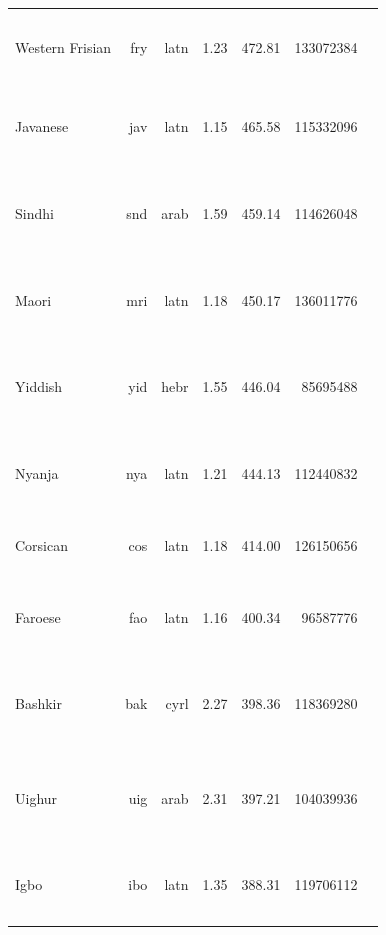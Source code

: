 \documentclass[11pt]{article}
\begin{document}
\begin{center}
\begin{longtable}[width=0.9\textwidth]{|lrrrrrl|}
Western Frisian & fry & latn & 1.23 & 472.81 & 133072384 & {\color{oscar}\rule{0.26cm}{8pt}}{\color{madlad400}\rule{2.68cm}{8pt}}{\color{glot500}\rule{0.55cm}{8pt}}{\color{other}\rule{0.5099999999999998cm}{8pt}} \\ 
Javanese & jav & latn & 1.15 & 465.58 & 115332096 & {\color{oscar}\rule{0.0cm}{8pt}}{\color{nllb}\rule{1.55cm}{8pt}}{\color{madlad400}\rule{1.86cm}{8pt}}{\color{glot500}\rule{0.27cm}{8pt}}{\color{other}\rule{0.31999999999999984cm}{8pt}} \\ 
Sindhi & snd & arab & 1.59 & 459.14 & 114626048 & {\color{oscar}\rule{0.16cm}{8pt}}{\color{nllb}\rule{1.4cm}{8pt}}{\color{madlad400}\rule{2.13cm}{8pt}}{\color{glot500}\rule{0.2cm}{8pt}}{\color{other}\rule{0.11000000000000032cm}{8pt}} \\ 
Maori & mri & latn & 1.18 & 450.17 & 136011776 & {\color{nllb}\rule{0.7cm}{8pt}}{\color{madlad400}\rule{1.56cm}{8pt}}{\color{glot500}\rule{1.69cm}{8pt}}{\color{other}\rule{0.050000000000000266cm}{8pt}} \\ 
Yiddish & yid & hebr & 1.55 & 446.04 & 85695488 & {\color{oscar}\rule{0.35cm}{8pt}}{\color{nllb}\rule{0.84cm}{8pt}}{\color{madlad400}\rule{2.33cm}{8pt}}{\color{glot500}\rule{0.37cm}{8pt}}{\color{other}\rule{0.10999999999999988cm}{8pt}} \\ 
Nyanja & nya & latn & 1.21 & 444.13 & 112440832 & {\color{nllb}\rule{1.41cm}{8pt}}{\color{madlad400}\rule{1.19cm}{8pt}}{\color{glot500}\rule{1.38cm}{8pt}}{\color{other}\rule{0.020000000000000462cm}{8pt}} \\ 
Corsican & cos & latn & 1.18 & 414.00 & 126150656 & {\color{madlad400}\rule{1.52cm}{8pt}}{\color{glot500}\rule{2.44cm}{8pt}}{\color{other}\rule{0.040000000000000036cm}{8pt}} \\ 
Faroese & fao & latn & 1.16 & 400.34 & 96587776 & {\color{nllb}\rule{0.32cm}{8pt}}{\color{madlad400}\rule{1.7cm}{8pt}}{\color{glot500}\rule{1.91cm}{8pt}}{\color{other}\rule{0.07000000000000028cm}{8pt}} \\ 
Bashkir & bak & cyrl & 2.27 & 398.36 & 118369280 & {\color{oscar}\rule{0.16cm}{8pt}}{\color{nllb}\rule{0.68cm}{8pt}}{\color{madlad400}\rule{1.17cm}{8pt}}{\color{glot500}\rule{1.2cm}{8pt}}{\color{other}\rule{0.79cm}{8pt}} \\ 
Uighur & uig & arab & 2.31 & 397.21 & 104039936 & {\color{oscar}\rule{0.35cm}{8pt}}{\color{nllb}\rule{0.65cm}{8pt}}{\color{madlad400}\rule{2.6cm}{8pt}}{\color{glot500}\rule{0.27cm}{8pt}}{\color{other}\rule{0.1299999999999999cm}{8pt}} \\ 
Igbo & ibo & latn & 1.35 & 388.31 & 119706112 & {\color{nllb}\rule{1.06cm}{8pt}}{\color{madlad400}\rule{1.25cm}{8pt}}{\color{glot500}\rule{1.27cm}{8pt}}{\color{other}\rule{0.41999999999999993cm}{8pt}} \\ 

\end{longtable}
\end{center}
\end{document}
